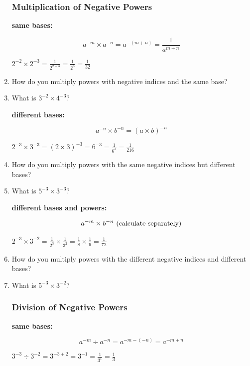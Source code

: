 \documentclass{article}
\begin{document}
\begin{enumerate}
\subsubsection*{Multiplication of Negative Powers}

\textbf{same bases:}
\begin{Large}
$$a^{-m} \times a^{-n}=a^{-(m+n)}=\frac{1}{a^{m+n}}$$
\end{Large}
\begin{center}
$2^{-2} \times 2^{-3}=\frac{1}{2^{2+3}}=\frac{1}{2^5}=\frac{1}{32}$
\end{center}

\item How do you multiply powers with negative indices and the same base?
\item What is $3^{-2}\times 4^{-3}$?

\textbf{different bases:}
\begin{Large}
$$a^{-n}\times b^{-n}=(a\times b)^{-n}$$
\end{Large}
\begin{center}
$2^{-3}\times 3^{-3}=(2\times 3)^{-3}=6^{-3}= \frac{1}{6^3}=\frac{1}{216}$
\end{center}

\item How do you multiply powers with the same negative indices but different bases?
\item What is $5^{-3}\times3^{-3}$?

\vspace{16pt}
\textbf{different bases and powers:}
\begin{Large}
$$a^{-m} \times b^{-n}\ \text{\normalsize (calculate separately)}$$
\end{Large}
\begin{center}
$2^{-3} \times 3^{-2}=\frac{1}{2^3} \times \frac{1}{3^2}=\frac{1}{8} \times \frac{1}{9}=\frac{1}{72}$
\end{center}

\item How do you multiply powers with the different negative indices and different bases?
\item What is $5^{-3}\times3^{-2}$?

\subsubsection*{Division of Negative Powers}

\textbf{same bases:}
\begin{Large}
$$a^{-m} \div a^{-n}=a^{-m-(-n)}=a^{-m+n}$$
\end{Large}
\begin{center}
$3^{-3} \div 3^{-2}=3^{-3+2}=3^{-1}=\frac{1}{3^1}=\frac{1}{3}$
\end{center}


\end{enumerate}
\end{document}
